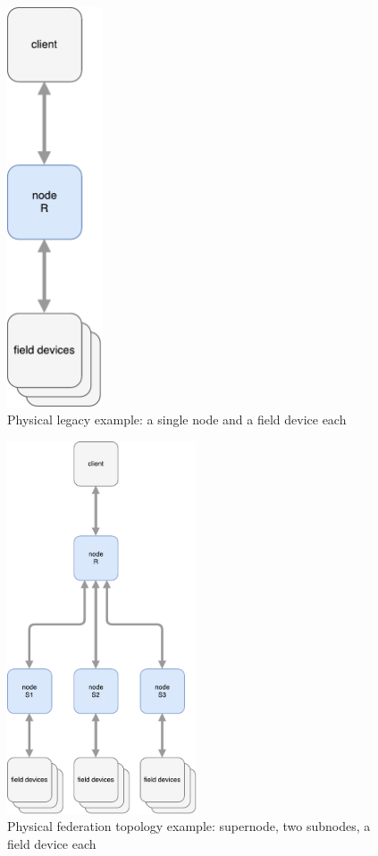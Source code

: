 \begin{figure}[]
	\center
	\includegraphics[width=0.25\textwidth]{img/topo_sl_noha.pdf}
	\caption{Physical legacy example: a single node and a field device each}
	\label{fig:topo:sl:noha}
\end{figure}
\begin{figure}[]
	\center
	\includegraphics[width=0.5\textwidth]{img/topo_ml_noha.pdf}
	\caption{Physical federation topology example: supernode, two subnodes, a field device each}
	\label{fig:topo:ml:noha}
\end{figure}

